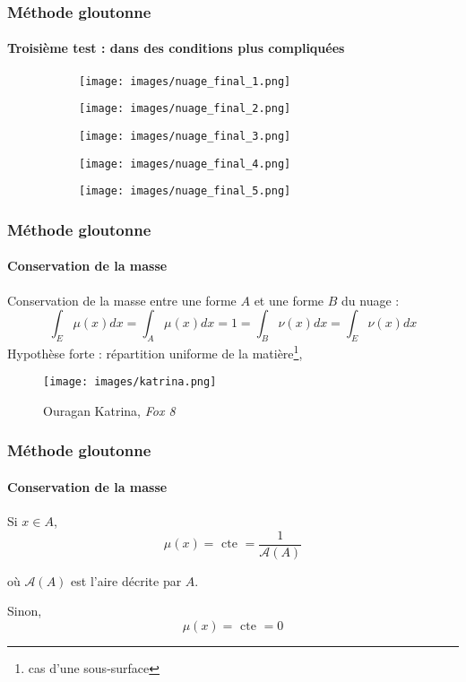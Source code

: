 \documentclass{beamer}
\begin{document}
\begin{frame}
	\frametitle{Méthode gloutonne}
	\framesubtitle{Troisième test : dans des conditions plus compliquées}
	\begin{figure}[!htb]
			\centering 
			\begin{subfigure}{0.25\textwidth}
				\centering 
				\texttt{[image: images/nuage\_final\_1.png]}
			\end{subfigure}
			\hspace*{\fill}
			\begin{subfigure}{0.25\textwidth}
				\centering 
				\texttt{[image: images/nuage\_final\_2.png]}
			\end{subfigure}
			\hspace*{\fill}
			\begin{subfigure}{0.25\textwidth}
				\centering 
				\texttt{[image: images/nuage\_final\_3.png]}
			\end{subfigure}
			\hspace*{\fill}
			
		\end{figure}
		\begin{figure}[!htb]

			\centering 
			\hspace*{\fill}
			\begin{subfigure}{0.25\textwidth}
				\centering 
				\texttt{[image: images/nuage\_final\_4.png]}
			\end{subfigure}
			\hspace*{\fill}
			\begin{subfigure}{0.25\textwidth}
				\centering 
				\texttt{[image: images/nuage\_final\_5.png]}
			\end{subfigure}
			\hspace*{\fill}
		\end{figure}
\end{frame}

\begin{frame}
	\frametitle{Méthode gloutonne}
	\framesubtitle{Conservation de la masse}
	Conservation de la masse entre une forme $A$ et une forme $B$ du nuage : \[\int_E \mu(x) dx = \boxed{\int_A \mu(x)dx =1 = \int_B \nu(x)dx} = \int_E \nu(x) dx\]
	Hypothèse forte : répartition uniforme de la matière\footnote{cas d'une sous-surface}, 
	\begin{figure}[h!]
		\centering 
		\texttt{[image: images/katrina.png]}
		\caption{Ouragan Katrina, \emph{Fox 8}}
	\end{figure}
\end{frame}
\begin{frame}
	\frametitle{Méthode gloutonne}
	\framesubtitle{Conservation de la masse}
	Si $x \in A$,
	\[\mu(x) = \text{ cte } = \frac{1}{\mathcal{A}(A)}\]
	\begin{flushright}
		où $\mathcal{A}(A)$ est l'aire décrite par $A$.
	\end{flushright}
	Sinon, 
	\[\mu(x) = \text{ cte } = 0 \]
\end{frame}
\end{document}
